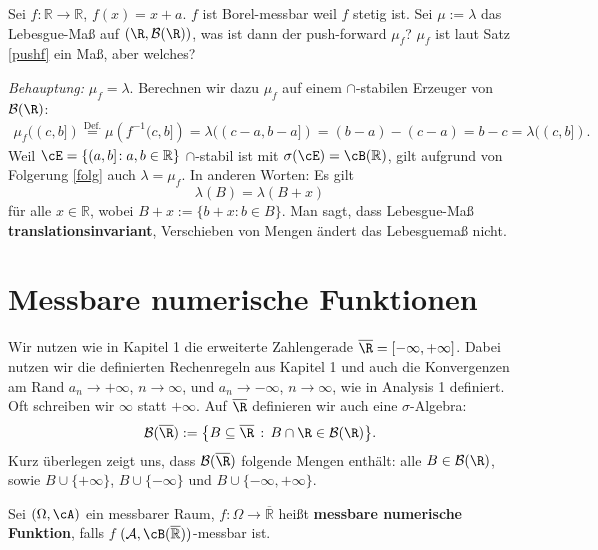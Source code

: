 \begin{beispiel}
	Sei $f \! : \mathbb{R} \rightarrow \mathbb{R}$, $f(x) = x + a$. $f$ ist Borel-messbar weil $f$ stetig ist. Sei $\mu:=\lambda$ das Lebesgue-Maß auf $(\R, \mathcal B(\R))$, was ist dann der push-forward $\mu_f$? $\mu_f$ ist laut Satz \ref{pushf} ein Maß, aber welches?\smallskip
	
	\textit{Behauptung:} $\mu_f = \lambda$. Berechnen wir dazu $\mu_f$ auf einem $\cap$-stabilen Erzeuger von $\mathcal B(\R)$:
	\begin{gather*}
		\mu_f((c,b]) \overset{\text{Def.}}{=} \mu(f^{-1}\big(c,b\big]) = \lambda((c-a,b-a]) = (b-a) - (c-a) = b-c=\lambda((c,b]).
	\end{gather*}	
	Weil $\cE = \{ (a,b] \! : a,b \in \mathbb{R} \}$ $\cap$-stabil ist mit $\sigma(\cE) = \cB(\mathbb{R})$, gilt aufgrund von Folgerung \ref{folg} auch $\lambda = \mu_f$. In anderen Worten: Es gilt $$\lambda(B) = \lambda(B + x)$$ f\"ur alle $x \in \mathbb{R}$, wobei $B+x := \{ b+x:b\in B \}$. Man sagt, dass Lebesgue-Maß  \textbf{translationsinvariant}, Verschieben von Mengen \"andert das Lebesguema\ss{} nicht.
\end{beispiel}

\section{Messbare numerische Funktionen}

Wir nutzen wie in Kapitel 1 die erweiterte Zahlengerade $\overline \R=[-\infty,+\infty]$. Dabei nutzen wir die definierten \glqq Rechenregeln\grqq{} aus Kapitel 1 und auch die Konvergenzen am Rand $a_n \rightarrow +\infty$, $n \to \infty$, und $a_n \rightarrow -\infty$, $n \to \infty$, wie in Analysis 1 definiert. Oft schreiben wir $\infty$ statt $+\infty$. Auf $\overline \R$ definieren wir auch eine $\sigma$-Algebra:
\begin{align*}
	\mathcal B(\overline \R):=\big \{ B\subseteq \overline \R\,: \, B\cap \R\in \mathcal B(\R)\big \}.
\end{align*}
Kurz \"uberlegen zeigt uns, dass $\mathcal B(\overline \R)$ folgende Mengen enth\"alt: alle $B\in \mathcal B(\R)$, sowie $B \cup \{+\infty\}$, $B\cup \{-\infty\}$ und $B\cup \{-\infty,+\infty\}$.
\begin{deff}
	Sei $(\Omega, \cA)$ ein messbarer Raum, $f \! : \Omega \rightarrow \overline{\mathbb{R}}$ heißt \textbf{messbare numerische Funktion}, falls $f$ $(\mathcal A, \cB(\overline{\mathbb{R}}))$-messbar ist.
\end{deff}

